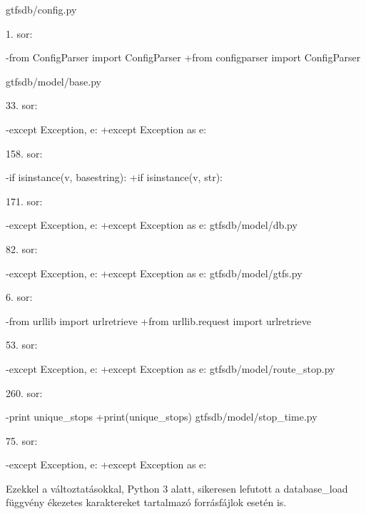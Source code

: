 gtfsdb/config.py

1. sor:
\begin{python}
-from ConfigParser import ConfigParser
+from configparser import ConfigParser
\end{python}

gtfsdb/model/base.py

33. sor:
\begin{python}
-except Exception, e:
+except Exception as e: 
\end{python}

158. sor:
\begin{python}
-if isinstance(v, basestring):
+if isinstance(v, str):
\end{python}

171. sor:
\begin{python}
-except Exception, e:
+except Exception as e:
gtfsdb/model/db.py
\end{python}

82. sor:
\begin{python}
-except Exception, e:
+except Exception as e:
gtfsdb/model/gtfs.py
\end{python}

6. sor:
\begin{python}
-from urllib import urlretrieve
+from urllib.request import urlretrieve
\end{python}

53. sor:
\begin{python}
-except Exception, e:
+except Exception as e:
gtfsdb/model/route_stop.py
\end{python}

260. sor:
\begin{python}
-print unique_stops
+print(unique_stops)
gtfsdb/model/stop_time.py
\end{python}

75. sor:
\begin{python}
-except Exception, e:
+except Exception as e:
\end{python}

Ezekkel a változtatásokkal, Python 3 alatt, sikeresen lefutott a database\_load függvény ékezetes karaktereket tartalmazó forrásfájlok esetén is.

